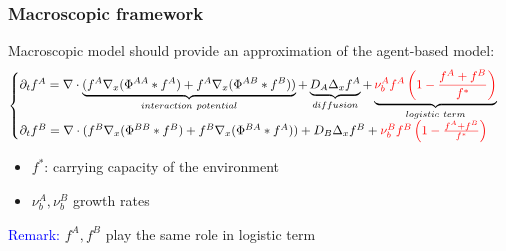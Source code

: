 \documentclass[10pt]{beamer}
\def \p {{\partial}}
\theoremstyle{remark}
\newcommand\Fontvii{\fontsize{9}{7.2}\selectfont}
\begin{document}
\begin{frame}
\frametitle{Macroscopic framework}
\Fontvii
Macroscopic model should provide an approximation of the agent-based model:
	\begin{equation*}
\begin{cases}
\p_t f^{A}=  \nabla \cdot \underbrace{(f^A\nabla_x(\Phi^{AA}* f^A) + f^A \nabla_x( \Phi^{AB}*f^B))}_{interaction \ potential} + \underbrace{ D_A \Delta_x f^A}_{diffusion} + \underbrace{ \textcolor{red}{\nu_{b}^{A}f^A\left( 1-\frac{f^A+f^B}{f^{*}} \right)}}_{logistic \ term} \\

\p_t f^{B}=  \nabla \cdot (f^B\nabla_x(\Phi^{BB}* f^B) + f^B \nabla_x (\Phi^{BA}*f^A)) + D_B \Delta_x f^B + \textcolor{red}{\nu_{b}^{B}f^B\left( 1-\frac{f^A+f^B}{f^{*}} \right)}
\end{cases}
\end{equation*}
\begin{itemize}
	\item  $f^*$: carrying capacity of the environment
	\item $\nu_{b}^{A},\nu_{b}^{B}$ growth rates
\end{itemize}
\vspace{0.5cm}

\textcolor{blue}{Remark:}
	$f^{A},f^{B}$ play the same role in logistic term


\end{frame}
\end{document}
